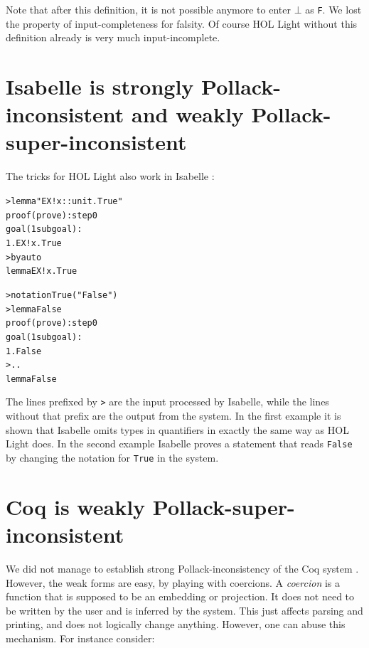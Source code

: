 \documentclass{entcs}
\begin{document}
Note that after this definition, it is not possible anymore to enter
$\bot$ as \texttt{F}.
We lost the property of input-completeness for falsity.
Of course {\small HOL} Light without this definition already is very
much input-incomplete.


\section{Isabelle is strongly Pollack-inconsistent and weak\-ly Pol\-lack-super-inconsistent}
\label{isa}

The tricks for {\small HOL} Light also work
in Isabelle \cite{isa:xx,nip:pau:wen:02}:

\begin{alltt}
> lemma "EX! x::unit. True"\medskip
proof (prove): step 0\medskip
goal (1 subgoal):
 1. EX! x. True
>  by auto
lemma EX! x. True
\end{alltt}

\begin{alltt}
> notation True ("False")
> lemma False\medskip
proof (prove): step 0\medskip
goal (1 subgoal):
 1. False
>  ..
lemma False
\end{alltt}

\noindent
The lines prefixed by \texttt{>} are the input processed by Isabelle,
while the lines without that prefix are the output from the system.
In the first example it is shown that Isabelle omits types in quantifiers
in exactly the same way as {\small HOL} Light does.
In the second example Isabelle proves a statement that reads \texttt{False}
by changing the notation for \texttt{True} in the system.



\section{Coq is weakly Pollack-super-inconsistent}
\label{coq}

We did not manage to establish strong Pollack-inconsistency of the Coq
system \cite{coq:xx,coq:08}.
However, the weak forms are easy, by playing with coercions.
A \emph{coercion} is a function that is supposed to be an embedding
or projection.
It does not need to be written
by the user and is inferred by the system.
This just affects parsing and printing, and does not logically change anything.
However, one can abuse this mechanism.
For instance consider:
\end{document}

